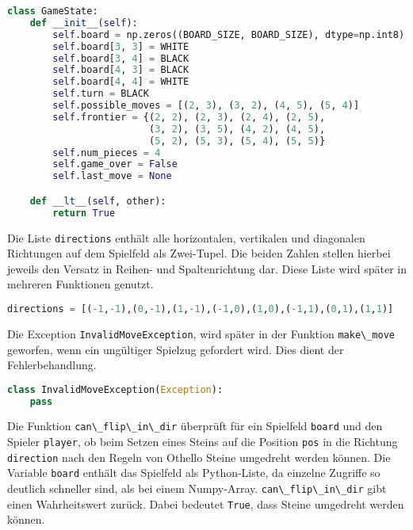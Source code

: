 \begin{lstlisting}[language=Python]
class GameState:
    def __init__(self):
        self.board = np.zeros((BOARD_SIZE, BOARD_SIZE), dtype=np.int8)
        self.board[3, 3] = WHITE
        self.board[3, 4] = BLACK
        self.board[4, 3] = BLACK
        self.board[4, 4] = WHITE
        self.turn = BLACK
        self.possible_moves = [(2, 3), (3, 2), (4, 5), (5, 4)]
        self.frontier = {(2, 2), (2, 3), (2, 4), (2, 5),
                         (3, 2), (3, 5), (4, 2), (4, 5),
                         (5, 2), (5, 3), (5, 4), (5, 5)}
        self.num_pieces = 4
        self.game_over = False
        self.last_move = None

    def __lt__(self, other):
        return True
\end{lstlisting}

Die Liste \passthrough{\lstinline!directions!} enthält alle
horizontalen, vertikalen und diagonalen Richtungen auf dem Spielfeld als
Zwei-Tupel. Die beiden Zahlen stellen hierbei jeweils den Versatz in
Reihen- und Spaltenrichtung dar. Diese Liste wird später in mehreren
Funktionen genutzt.

\begin{lstlisting}[language=Python]
directions = [(-1,-1),(0,-1),(1,-1),(-1,0),(1,0),(-1,1),(0,1),(1,1)]
\end{lstlisting}

Die Exception \passthrough{\lstinline!InvalidMoveException!}, wird
später in der Funktion \passthrough{\lstinline!make\_move!} geworfen,
wenn ein ungültiger Spielzug gefordert wird. Dies dient der
Fehlerbehandlung.

\begin{lstlisting}[language=Python]
class InvalidMoveException(Exception):
    pass
\end{lstlisting}

Die Funktion \passthrough{\lstinline!can\_flip\_in\_dir!} überprüft für
ein Spielfeld \passthrough{\lstinline!board!} und den Spieler
\passthrough{\lstinline!player!}, ob beim Setzen eines Steins auf die
Position \passthrough{\lstinline!pos!} in die Richtung
\passthrough{\lstinline!direction!} nach den Regeln von Othello Steine
umgedreht werden können. Die Variable \passthrough{\lstinline!board!}
enthält das Spielfeld als Python-Liste, da einzelne Zugriffe so deutlich
schneller sind, als bei einem Numpy-Array.
\passthrough{\lstinline!can\_flip\_in\_dir!} gibt einen Wahrheitswert
zurück. Dabei bedeutet \passthrough{\lstinline!True!}, dass Steine
umgedreht werden können.

